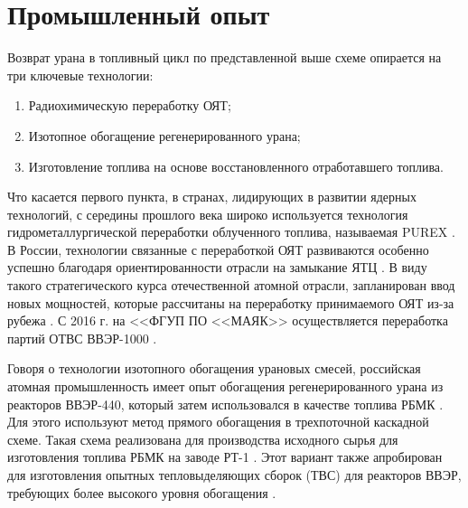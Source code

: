 \section{Промышленный опыт}\label{sec:ch1/sec1}

Возврат урана в топливный цикл по представленной выше схеме опирается на три ключевые технологии:
\begin{enumerate}
  \item Радиохимическую переработку ОЯТ;
  \item Изотопное обогащение регенерированного урана;
  \item Изготовление топлива на основе восстановленного отработавшего топлива.
\end{enumerate}

Что касается первого пункта, в странах, лидирующих в развитии ядерных технологий, с середины прошлого века широко используется технология гидрометаллургической переработки облученного топлива, называемая PUREX \cite{selvaduraySurveyNuclearFuel1979}. В России, технологии связанные с переработкой ОЯТ развиваются особенно успешно благодаря ориентированности отрасли на замыкание ЯТЦ \cite{balihinSostoyaniiPerspektivahRazvitiya2018, efimenkoProblemyPerspektivyRazvitiya2017}. В виду такого стратегического курса отечественной атомной отрасли, запланирован ввод новых мощностей, которые рассчитаны на переработку принимаемого ОЯТ из-за рубежа \cite{050519L3942005}. С 2016 г. на <<ФГУП ПО <<МАЯК>> осуществляется переработка партий ОТВС ВВЭР-1000 \cite{PyatyyNacionalnyyDoklad}.

Говоря о технологии изотопного обогащения урановых смесей, российская атомная промышленность имеет опыт обогащения регенерированного урана из реакторов ВВЭР-440, который затем использовался в качестве топлива РБМК \cite{VVER10001200Za}. Для этого используют метод прямого обогащения в трехпоточной каскадной схеме. Такая схема реализована для производства исходного сырья для изготовления топлива РБМК на заводе РТ-1 \cite{volkVozvratUranaIz2010}. Этот вариант также апробирован для изготовления опытных тепловыделяющих сборок (ТВС) для реакторов ВВЭР, требующих более высокого уровня обогащения \cite{proselkovAnalizVozmozhnostiIspolzovaniya2003}.

